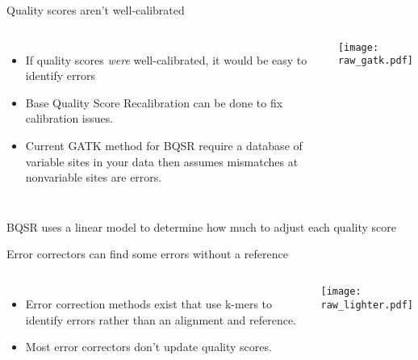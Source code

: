 \documentclass{beamer}
\begin{document}
\begin{frame}{Quality scores aren't well-calibrated}
\begin{columns}
\begin{itemize}
\item If quality scores \textit{were} well-calibrated, it would be easy to identify errors
\item Base Quality Score Recalibration can be done to fix calibration issues.
\item Current GATK method for BQSR require a database of variable sites in your data
then assumes mismatches at nonvariable sites are errors.
\end{itemize}
\texttt{[image: raw\_gatk.pdf]}
\end{columns}
\end{frame}

\begin{frame}{BQSR uses a linear model to determine how much to adjust each quality score}
\centering
{}
\end{frame}

\begin{frame}{Error correctors can find some errors without a reference}
\begin{columns}
\begin{itemize}
\item Error correction methods exist that use k-mers to identify errors rather than an alignment and reference.
\item Most error correctors don't update quality scores.
\end{itemize}

\texttt{[image: raw\_lighter.pdf]}
\end{columns}
\end{frame}
\end{document}
